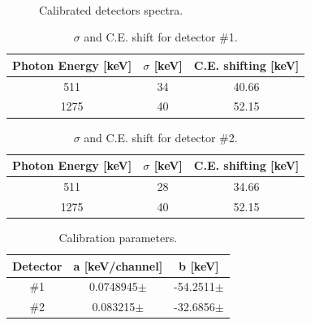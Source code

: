 \documentclass[a4paper,11pt]{article}
\begin{document}
\begin{figure}[h!]
\centering
{} \quad
{} \\
\caption{Calibrated detectors spectra.}
\label{fig: calibrated energy spectra}
\end{figure}

\begin{table}[h!]
\centering
\begin{tabular}{ccc}
\toprule
\toprule
Photon Energy [keV] & $\sigma$ [keV] & C.E. shifting [keV] \\
\midrule
511 & 34& 40.66 \\
1275 & 40 & 52.15\\
\bottomrule
\bottomrule
\end{tabular}
\caption{$\sigma$ and C.E. shift for detector \#1.}
\end{table}

\begin{table}[h!]
\centering
\begin{tabular}{ccc}
\toprule
\toprule
Photon Energy [keV] & $\sigma$ [keV] & C.E. shifting [keV] \\
\midrule
511 & 28 & 34.66 \\
1275 & 40 & 52.15\\
\bottomrule
\bottomrule
\end{tabular}
\caption{$\sigma$ and C.E. shift for detector \#2.}
\end{table}
\begin{table}[h!]
\centering
\begin{tabular}{ccc}
\toprule
\toprule
Detector & a [keV/channel] & b [keV] \\
\midrule
\#1 &  0.0748945$\pm$ & -54.2511$\pm$ \\
\#2 & 0.083215$\pm$ & -32.6856$\pm$ \\
\bottomrule
\bottomrule
\end{tabular}
\caption{Calibration parameters.}
\end{table}
\end{document}
